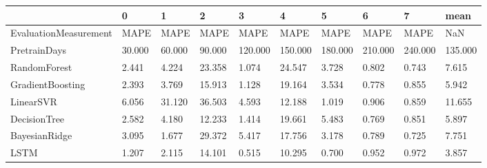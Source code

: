 \begin{tabular}{llllllllll}
\toprule
{} &      0 &      1 &      2 &       3 &       4 &       5 &       6 &       7 &    mean \\
\midrule
EvaluationMeasurement &   MAPE &   MAPE &   MAPE &    MAPE &    MAPE &    MAPE &    MAPE &    MAPE &     NaN \\
PretrainDays          & 30.000 & 60.000 & 90.000 & 120.000 & 150.000 & 180.000 & 210.000 & 240.000 & 135.000 \\
RandomForest          &  2.441 &  4.224 & 23.358 &   1.074 &  24.547 &   3.728 &   0.802 &   0.743 &   7.615 \\
GradientBoosting      &  2.393 &  3.769 & 15.913 &   1.128 &  19.164 &   3.534 &   0.778 &   0.855 &   5.942 \\
LinearSVR             &  6.056 & 31.120 & 36.503 &   4.593 &  12.188 &   1.019 &   0.906 &   0.859 &  11.655 \\
DecisionTree          &  2.582 &  4.180 & 12.233 &   1.414 &  19.661 &   5.483 &   0.769 &   0.851 &   5.897 \\
BayesianRidge         &  3.095 &  1.677 & 29.372 &   5.417 &  17.756 &   3.178 &   0.789 &   0.725 &   7.751 \\
LSTM                  &  1.207 &  2.115 & 14.101 &   0.515 &  10.295 &   0.700 &   0.952 &   0.972 &   3.857 \\
\bottomrule
\end{tabular}

